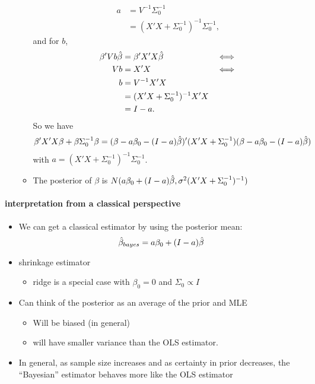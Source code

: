 \begin{itemize}
\begin{itemize}
\begin{align*}
    a        &= V^{-1} \Sigma_0^{-1} \\
             &= (X'X + \Sigma_0^{-1})^{-1} \Sigma_0^{-1},
  \end{align*}
  and for $b$,
  \begin{align*}
    \beta'V b \hat{\beta} &= \beta'X'X \hat{\beta} & \iff \\
    V b       &= X'X & \iff \\
    b         &= V^{-1} X'X \\
              &= (X'X + \Sigma_0^{-1})^{-1} X'X \\
              &= I - a.
  \end{align*}
  So we have 
  \[\beta'X'X\beta + \beta \Sigma_0^{-1} \beta  = (\beta - a \beta_0 - (I - a) \hat{\beta})'(X'X + \Sigma_0^{-1}) (\beta - a \beta_0 - (I - a) \hat{\beta})\] 
  with $a = (X'X + \Sigma_0^{-1})^{-1}\Sigma_0^{-1}$.
\item The posterior of $\beta$ is $N(a \beta_0 + (I - a)\hat{\beta}, \sigma^2 (X'X + \Sigma_0^{-1})^{-1})$
\end{itemize}
\end{itemize}

\paragraph{interpretation from a classical perspective}
\begin{itemize}
\item We can get a classical estimator by using the posterior mean:
  \[ \hat{\beta}_{bayes} = a\beta_0 + (I-a)\hat{\beta} \]
\item shrinkage estimator
\begin{itemize}
\item ridge is a special case with $\beta_0 = 0$ and $\Sigma_0 \propto I$
\end{itemize}
\item Can think of the posterior as an average of the prior and MLE
\begin{itemize}
\item Will be biased (in general)
\item will have smaller variance than the OLS estimator.
\end{itemize}
\item In general, as sample size increases and as certainty in
        prior decreases, the ``Bayesian'' estimator behaves more like the
        OLS estimator
\end{itemize}

